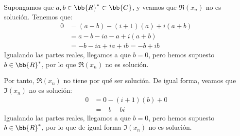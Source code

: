 \begin{ejercicio}
    Supongamos que $a,b\in \bb{R}^\ast\subset \bb{C}$, y veamos que $\Re(x_n)$ no es solución. Tenemos que:
    \begin{align*}
        0 &= (a-b) - (i+1)(a) + i(a+b)\\
        &= a-b-ia-a+i(a+b)\\
        &= -b-ia+ia+ib = -b +ib
    \end{align*}
    Igualando las partes reales, llegamos a que $b=0$, pero hemos supuesto $b\in \bb{R}^\ast$, por lo que $\Re(x_n)$ no es solución.
    
    Por tanto, $\Re(x_n)$ no tiene por qué ser solución. De igual forma, veamos que $\Im(x_n)$ no es solución:
    \begin{align*}
        0 &= 0 - (i+1)(b) + 0\\
        &= -b-bi
    \end{align*}
    Igualando las partes reales, llegamos a que $b=0$, pero hemos supuesto $b\in \bb{R}^\ast$, por lo que de igual forma $\Im(x_n)$ no es solución.
\end{ejercicio}